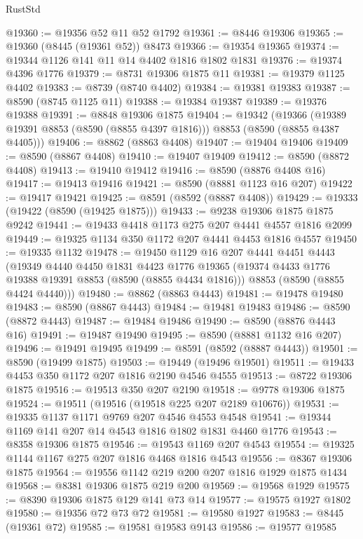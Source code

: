 \begin{lexlean}{RustStd}
\begin{coremodule}
@19360 := @19356 @52 @11 @52 @1792
@19361 := @8446 @19306
@19365 := @19360 (@8445 (@19361 @52)) @8473
@19366 := @19354 @19365
@19374 := @19344 @1126 @141 @11 @14 @4402 @1816 @1802 @1831
@19376 := @19374 @4396 @1776
@19379 := @8731 @19306 @1875 @11
@19381 := @19379 @1125 @4402
@19383 := @8739 (@8740 @4402)
@19384 := @19381 @19383
@19387 := @8590 (@8745 @1125 @11)
@19388 := @19384 @19387
@19389 := @19376 @19388
@19391 := @8848 @19306 @1875
@19404 := @19342
    (@19366 (@19389 @19391 @8853 (@8590 (@8855 @4397 @1816))) @8853 (@8590 (@8855 @4387 @4405)))
@19406 := @8862 (@8863 @4408)
@19407 := @19404 @19406
@19409 := @8590 (@8867 @4408)
@19410 := @19407 @19409
@19412 := @8590 (@8872 @4408)
@19413 := @19410 @19412
@19416 := @8590 (@8876 @4408 @16)
@19417 := @19413 @19416
@19421 := @8590 (@8881 @1123 @16 @207)
@19422 := @19417 @19421
@19425 := @8591 (@8592 (@8887 @4408))
@19429 := @19333 (@19422 (@8590 (@19425 @1875)))
@19433 := @9238 @19306 @1875 @1875 @9242
@19441 := @19433 @4418 @1173 @275 @207 @4441 @4557 @1816 @2099
@19449 := @19325 @1134 @350 @1172 @207 @4441 @4453 @1816 @4557
@19450 := @19335 @1132
@19478 := @19450
    @1129
    @16
    @207
    @4441
    @4451
    @4443
    (@19349
      @4440
      @4450
      @1831
      @4423
      @1776
      @19365
      (@19374 @4433 @1776 @19388 @19391 @8853 (@8590 (@8855 @4434 @1816)))
      @8853
      (@8590 (@8855 @4424 @4440)))
@19480 := @8862 (@8863 @4443)
@19481 := @19478 @19480
@19483 := @8590 (@8867 @4443)
@19484 := @19481 @19483
@19486 := @8590 (@8872 @4443)
@19487 := @19484 @19486
@19490 := @8590 (@8876 @4443 @16)
@19491 := @19487 @19490
@19495 := @8590 (@8881 @1132 @16 @207)
@19496 := @19491 @19495
@19499 := @8591 (@8592 (@8887 @4443))
@19501 := @8590 (@19499 @1875)
@19503 := @19449 (@19496 @19501)
@19511 := @19433 @4453 @350 @1172 @207 @1816 @2190 @4546 @4555
@19513 := @8722 @19306 @1875
@19516 := @19513 @350 @207 @2190
@19518 := @9778 @19306 @1875
@19524 := @19511 (@19516 (@19518 @225 @207 @2189 @10676))
@19531 := @19335 @1137 @1171 @9769 @207 @4546 @4553 @4548
@19541 := @19344 @1169 @141 @207 @14 @4543 @1816 @1802 @1831 @4460 @1776
@19543 := @8358 @19306 @1875
@19546 := @19543 @1169 @207 @4543
@19554 := @19325 @1144 @1167 @275 @207 @1816 @4468 @1816 @4543
@19556 := @8367 @19306 @1875
@19564 := @19556 @1142 @219 @200 @207 @1816 @1929 @1875 @1434
@19568 := @8381 @19306 @1875 @219 @200
@19569 := @19568 @1929
@19575 := @8390 @19306 @1875 @129 @141 @73 @14
@19577 := @19575 @1927 @1802
@19580 := @19356 @72 @73 @72
@19581 := @19580 @1927
@19583 := @8445 (@19361 @72)
@19585 := @19581 @19583 @9143
@19586 := @19577 @19585

\end{coremodule}
\end{lexlean}
